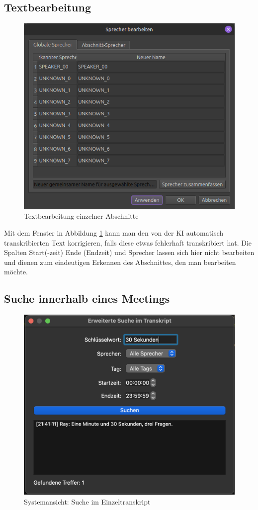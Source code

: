 \subsection{Textbearbeitung}
\label{sub:text}

\begin{figure}
\centering
\includegraphics[width=0.7\linewidth]{Bilder/Sprecher1}
\caption[Textbearbeitung]{Textbearbeitung einzelner Abschnitte}
\label{pic:text}
\end{figure}

Mit dem Fenster in Abbildung \ref{pic:text} kann man den von der \ac{KI} automatisch transkribierten Text korrigieren, falls diese etwas fehlerhaft transkribiert hat. Die Spalten Start(-zeit) Ende (Endzeit) und Sprecher lassen sich hier nicht bearbeiten und dienen zum eindeutigen Erkennen des Abschnittes, den man bearbeiten möchte.

\subsection{Suche innerhalb eines Meetings}

\begin{figure}
\centering
\includegraphics[width=0.7\linewidth]{Bilder/sucheInnerhalbMeeting.png}
\caption[Protokolsuche]{Systemansicht: Suche im Einzeltranskript}
\label{pic:lokalesuche}
\end{figure}

